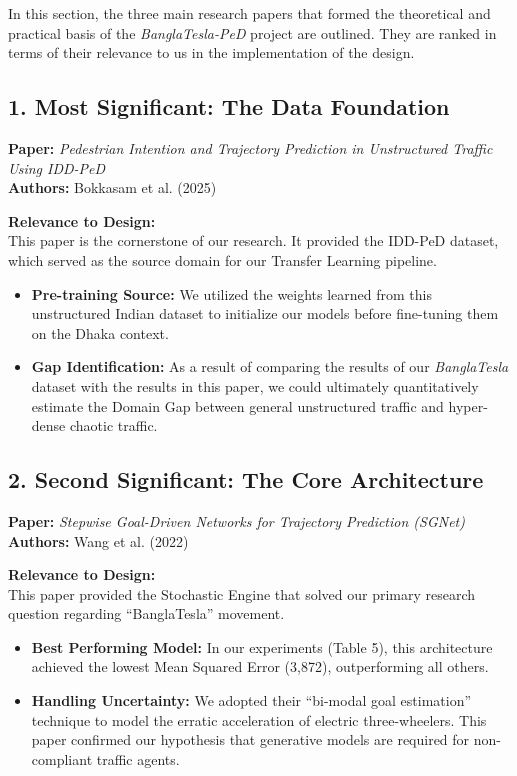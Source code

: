 \documentclass[12pt, a4paper]{article}
\begin{document}
In this section, the three main research papers that formed the theoretical and practical basis of the \textit{BanglaTesla-PeD} project are outlined. They are ranked in terms of their relevance to us in the implementation of the design.

\subsection*{1. Most Significant: The Data Foundation}
\textbf{Paper:} \textit{Pedestrian Intention and Trajectory Prediction in Unstructured Traffic Using IDD-PeD} \\
\textbf{Authors:} Bokkasam et al. (2025)

\noindent\textbf{Relevance to Design:} \\
This paper is the cornerstone of our research. It provided the IDD-PeD dataset, which served as the source domain for our Transfer Learning pipeline.
\begin{itemize}
    \item \textbf{Pre-training Source:} We utilized the weights learned from this unstructured Indian dataset to initialize our models before fine-tuning them on the Dhaka context.
    \item \textbf{Gap Identification:} As a result of comparing the results of our \textit{BanglaTesla} dataset with the results in this paper, we could ultimately quantitatively estimate the Domain Gap between general unstructured traffic and hyper-dense chaotic traffic.
\end{itemize}
 

\subsection*{2. Second Significant: The Core Architecture}
\textbf{Paper:} \textit{Stepwise Goal-Driven Networks for Trajectory Prediction (SGNet)} \\
\textbf{Authors:} Wang et al. (2022)

\noindent\textbf{Relevance to Design:} \\
This paper provided the Stochastic Engine that solved our primary research question regarding ``BanglaTesla'' movement.
\begin{itemize}
    \item \textbf{Best Performing Model:} In our experiments (Table 5), this architecture achieved the lowest Mean Squared Error (3,872), outperforming all others.
    \item \textbf{Handling Uncertainty:} We adopted their ``bi-modal goal estimation'' technique to model the erratic acceleration of electric three-wheelers. This paper confirmed our hypothesis that generative models are required for non-compliant traffic agents.
\end{itemize}
\end{document}
